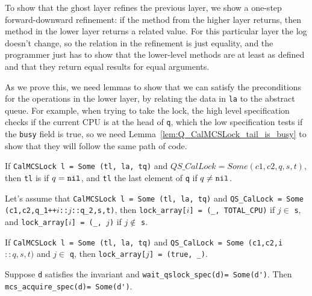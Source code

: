 To show that the ghost layer refines the previous layer, we show a
one-step forward-downward refinement: if the method from the higher
layer returns, then method in the lower layer returns a related
value. For this particular layer the log doesn't change, so the
relation in the refinement is just equality, and the programmer just
has to show that the lower-level methods are at least as defined and
that they return equal results for equal arguments.


As we prove this, we need lemmas to show that we can satisfy the preconditions for the operations in the lower layer, by relating the data in \lstinline$la$ to the abstract queue.  For example, when trying to take the lock, the high level specification checks if the current CPU is at the head of \lstinline$q$, which the low specification tests if the \lstinline$busy$ field is true, so we need Lemma~\ref{lem:Q_CalMCSLock_tail_is_busy} to show that they will follow the same path of code. 

\begin{lemma}
If \lstinline$CalMCSLock l = Some (tl, la, tq)$ and $QS\_CalLock = Some (c1,c2,q,s,t)$, then \lstinline$tl$ is  if $q = \mathrm{\texttt{nil}}$, and \lstinline$tl$ the last element of \lstinline$q$ if $q \neq \mathrm{\texttt{nil}}$.
\end{lemma}

\begin{lemma}
Let's assume that \lstinline$CalMCSLock l = Some (tl, la, tq)$ and \lstinline$QS_CalLock = Some (c1,c2,q_1++$$i$\lstinline$::$$j$\lstinline$::q_2,s,t)$, then \lstinline$lock_array[$$i$\lstinline$] = (_, TOTAL_CPU)$ if $j \in $ \lstinline$s$, and 
\lstinline$lock_array[$$i$\lstinline$] = (_, $$j$\lstinline$)$ if $j \not\in$ \lstinline$s$.
\end{lemma}

\begin{lemma}
\label{lem:Q_CalMCSLock_tail_is_busy}
If \lstinline$CalMCSLock l = Some (tl, la, tq)$ and \lstinline$QS_CalLock = Some (c1,c2,$\lstinline$i$$::q,s,t)$ and $j \in$ \lstinline$q$, then \lstinline$lock_array[$$j$\lstinline$] = (true, _)$.
\end{lemma}

\begin{theorem} Suppose \lstinline$d$ satisfies the invariant and
\lstinline$wait_qslock_spec(d)= Some(d')$. Then \lstinline$mcs_acquire_spec(d)= Some(d')$.
\end{theorem}


